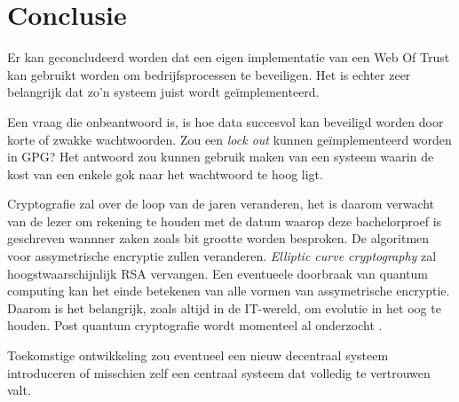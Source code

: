 
\chapter{Conclusie}
\label{ch:conclusie}


Er kan geconcludeerd worden dat een eigen implementatie van een Web Of Trust kan gebruikt worden om bedrijfsprocessen te beveiligen. Het is echter zeer belangrijk dat zo'n systeem juist wordt geïmplementeerd.

Een vraag die onbeantwoord is, is hoe data succesvol kan beveiligd worden door korte of zwakke wachtwoorden. Zou een \textit{lock out} kunnen geïmplementeerd worden in GPG? Het antwoord zou kunnen gebruik maken van een systeem waarin de kost van een enkele gok naar het wachtwoord te hoog ligt.

Cryptografie zal over de loop van de jaren veranderen, het is daarom verwacht van de lezer om rekening te houden met de datum waarop deze bachelorproef is geschreven wannner zaken zoals bit grootte worden besproken. De algoritmen voor assymetrische encryptie zullen veranderen. \textit{Elliptic curve cryptography} zal hoogstwaarschijnlijk RSA vervangen. Een eventueele doorbraak van quantum computing kan het einde betekenen van alle vormen van assymetrische encryptie. Daarom is het belangrijk, zoals altijd in de IT-wereld, om evolutie in het oog te houden. Post quantum cryptografie wordt momenteel al onderzocht \autocite{ANewHopeUsenix}.

Toekomstige ontwikkeling zou eventueel een nieuw decentraal systeem introduceren of misschien zelf een centraal systeem dat volledig te vertrouwen valt.

